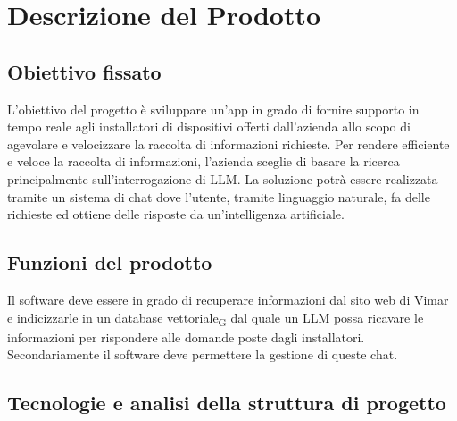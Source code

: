 \section{Descrizione del Prodotto}
\subsection{Obiettivo fissato}
L’obiettivo del progetto è sviluppare un’app in grado di fornire supporto in tempo reale agli installatori di dispositivi offerti dall’azienda allo scopo di agevolare e velocizzare la raccolta di informazioni richieste. Per rendere efficiente e veloce la raccolta di informazioni, l’azienda sceglie di basare la ricerca principalmente sull’interrogazione di LLM. La soluzione potrà essere realizzata tramite un sistema di chat dove l’utente, tramite linguaggio naturale, fa delle richieste ed ottiene delle risposte da un’intelligenza artificiale.

\subsection{Funzioni del prodotto}
Il software deve essere in grado di recuperare informazioni dal sito web di Vimar e indicizzarle in un database vettoriale\textsubscript{G} dal quale un LLM possa ricavare le informazioni per rispondere alle domande poste dagli installatori.
Secondariamente il software deve permettere la gestione di queste chat.

\subsection{Tecnologie  e analisi della struttura di progetto} 
